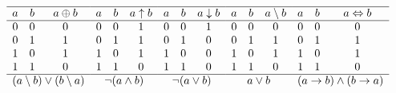 \documentclass[12pt]{article}
\begin{document}
    \begin{table}[H]
        \centering
        \hfill
        $\begin{array}{c c c}
            \hline
            a & b & a \oplus b\\
            \hline
            0 & 0 & 0\\
            0 & 1 & 1\\
            1 & 0 & 1\\
            1 & 1 & 0\\
            \hline
            \multicolumn{3}{c}{(a \setminus b) \lor (b \setminus a)}
        \end{array}
        \hfill
        \begin{array}{c c c}
            \hline
            a & b & a \uparrow b\\
            \hline
            0 & 0 & 1\\
            0 & 1 & 1\\
            1 & 0 & 1\\
            1 & 1 & 0\\
            \hline
            \multicolumn{3}{c}{\lnot (a \land b)}
        \end{array}
        \hfill
        \begin{array}{c c c}
            \hline
            a & b & a \downarrow b\\
            \hline
            0 & 0 & 1\\
            0 & 1 & 0\\
            1 & 0 & 0\\
            1 & 1 & 0\\
            \hline
            \multicolumn{3}{c}{\lnot (a \lor b)}
        \end{array}
        \hfill
        \begin{array}{c c c}
            \hline
            a & b & a \setminus b\\
            \hline
            0 & 0 & 0\\
            0 & 1 & 1\\
            1 & 0 & 1\\
            1 & 1 & 0\\
            \hline
            \multicolumn{3}{c}{a \lor b}
        \end{array}
        \hfill
        \begin{array}{c c c}
            \hline
            a & b & a \Leftrightarrow b\\
            \hline
            0 & 0 & 0\\
            0 & 1 & 1\\
            1 & 0 & 1\\
            1 & 1 & 0\\
            \hline
            \multicolumn{3}{c}{(a \to b) \land (b \to a)}
        \end{array}$
        \hfill
        \captionsetup{position=bottom}
        \caption{Tables de vérités et formule équivalente.}\label{tab:tab-verite} 
    \end{table}
\end{document}
